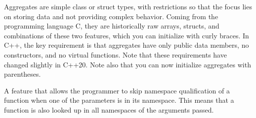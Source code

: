 


Aggregates are simple class or struct types, with restrictions so that the focus lies on storing data and not providing complex behavior. Coming from the programming language C, they are historically raw arrays, structs, and combinations of these two features, which you can initialize with curly braces. In C++, the key requirement is that aggregates have only public data members, no constructors, and no virtual functions. Note that these requirements have changed slightly in C++20. Note also that you can now initialize aggregates with parentheses.


A feature that allows the programmer to skip namespace qualification of a function when one of the parameters is in its namespace. This means that a function is also looked up in all namespaces of the arguments passed.






